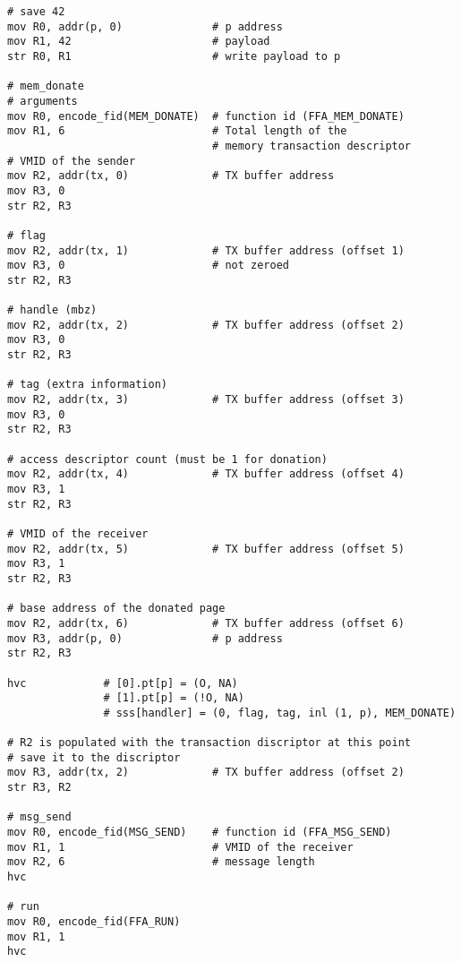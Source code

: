 \documentclass{article}
\begin{document}
\begin{lstlisting}[caption={VM 0}]
# save 42
mov R0, addr(p, 0)              # p address
mov R1, 42                      # payload
str R0, R1                      # write payload to p

# mem_donate
# arguments
mov R0, encode_fid(MEM_DONATE)  # function id (FFA_MEM_DONATE)
mov R1, 6                       # Total length of the  
                                # memory transaction descriptor
# VMID of the sender 
mov R2, addr(tx, 0)             # TX buffer address                               
mov R3, 0
str R2, R3

# flag
mov R2, addr(tx, 1)             # TX buffer address (offset 1)                               
mov R3, 0                       # not zeroed
str R2, R3

# handle (mbz)
mov R2, addr(tx, 2)             # TX buffer address (offset 2)
mov R3, 0
str R2, R3

# tag (extra information)
mov R2, addr(tx, 3)             # TX buffer address (offset 3)
mov R3, 0
str R2, R3

# access descriptor count (must be 1 for donation)
mov R2, addr(tx, 4)             # TX buffer address (offset 4)
mov R3, 1
str R2, R3

# VMID of the receiver
mov R2, addr(tx, 5)             # TX buffer address (offset 5)
mov R3, 1
str R2, R3

# base address of the donated page
mov R2, addr(tx, 6)             # TX buffer address (offset 6)
mov R3, addr(p, 0)              # p address
str R2, R3

hvc            # [0].pt[p] = (O, NA)
               # [1].pt[p] = (!O, NA)
               # sss[handler] = (0, flag, tag, inl (1, p), MEM_DONATE)

# R2 is populated with the transaction discriptor at this point
# save it to the discriptor
mov R3, addr(tx, 2)             # TX buffer address (offset 2)
str R3, R2

# msg_send
mov R0, encode_fid(MSG_SEND)    # function id (FFA_MSG_SEND)
mov R1, 1                       # VMID of the receiver
mov R2, 6                       # message length
hvc

# run
mov R0, encode_fid(FFA_RUN)
mov R1, 1
hvc
\end{lstlisting}
\end{document}
